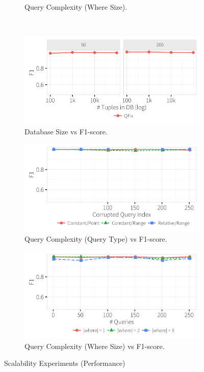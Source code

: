 \begin{figure}[h]
\begin{subfigure}[t]{.3\textwidth}
      \vspace*{-.1in}
      \caption{Query Complexity (Where Size).}
      \label{f:where_time} 
    \end{subfigure}
    \\
    \begin{subfigure}[t]{.3\textwidth}
      \includegraphics[width = .99\columnwidth]{figures/dbsize_acc}
      \vspace*{-.1in}
      \caption{Database Size vs F1-score. }
      \label{f:dbsize_acc} 
    \end{subfigure}
        \begin{subfigure}[t]{.3\textwidth}
      \includegraphics[width = .99\columnwidth]{figures/pointrelv_acc}
      \vspace*{-.1in}
      \caption{Query Complexity (Query Type) vs F1-score.}
      \label{f:qidx_acc} 
    \end{subfigure}
    \begin{subfigure}[t]{.3\textwidth}
      \includegraphics[width = .99\columnwidth]{figures/where_acc}
      \vspace*{-.1in}
      \caption{Query Complexity (Where Size) vs F1-score.}
      \label{f:where_acc} 
    \end{subfigure}
    
    \caption{Scalability Experiments (Performance)}
  \end{figure}
\fi

